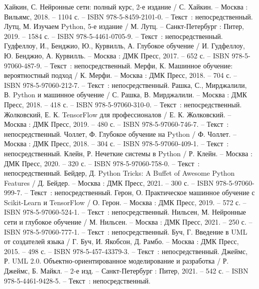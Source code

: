 
\begin{thebibliography}{50}

     Хайкин, С. Нейронные сети: полный курс, 2-е издание / С. Хайкин. – Москва : Вильямс, 2018. – 1104 с. – ISBN 978-5-8459-2101-0. – Текст~: непосредственный.
     Лутц, М. Изучаем Python, 5-е издание / М. Лутц. – Санкт-Петербург : Питер, 2019. – 1584 с. – ISBN 978-5-4461-0705-9. – Текст~: непосредственный.
     Гудфеллоу, И., Бенджио, Ю., Курвилль, А. Глубокое обучение / И. Гудфеллоу, Ю. Бенджио, А. Курвилль. – Москва : ДМК Пресс, 2017. – 652 с. – ISBN 978-5-97060-487-9. – Текст~: непосредственный.
     Мерфи, К. Машинное обучение: вероятностный подход / К. Мерфи. – Москва : ДМК Пресс, 2018. – 704 с. – ISBN 978-5-97060-212-7. – Текст~: непосредственный.
     Рашка, С., Мирджалили, В. Python и машинное обучение / С. Рашка, В. Мирджалили. – Москва : ДМК Пресс, 2018. – 418 с. – ISBN 978-5-97060-310-0. – Текст~: непосредственный.
     Жолковский, Е. К. TensorFlow для профессионалов / Е. К. Жолковский. – Москва : ДМК Пресс, 2019. – 480 с. – ISBN 978-5-97060-746-7. – Текст~: непосредственный.
     Чоллет, Ф. Глубокое обучение на Python / Ф. Чоллет. – Москва : ДМК Пресс, 2018. – 304 с. – ISBN 978-5-97060-409-1. – Текст~: непосредственный.
     Клейн, Р. Нечеткие системы в Python / Р. Клейн. – Москва : ДМК Пресс, 2020. – 320 с. – ISBN 978-5-97060-758-0. – Текст~: непосредственный.
     Бейдер, Д. Python Tricks: A Buffet of Awesome Python Features / Д. Бейдер. – Москва : ДМК Пресс, 2021. – 300 с. – ISBN 978-5-97060-999-7. – Текст~: непосредственный.
     Герон, О. Практическое машинное обучение с Scikit-Learn и TensorFlow / О. Герон. – Москва : ДМК Пресс, 2019. – 572 с. – ISBN 978-5-97060-524-1. – Текст~: непосредственный.
     Нильсен, М. Нейронные сети и глубокое обучение / М. Нильсен. – Москва : ДМК Пресс, 2021. – 250 с. – ISBN 978-5-97060-777-1. – Текст~: непосредственный.
     Буч, Г. Введение в UML от создателей языка / Г. Буч, И. Якобсон, Д. Рамбо. – Москва : ДМК Пресс, 2015. – 498 с. – ISBN 978-5-457-43379-3. – Текст~: непосредственный.
     Джеймс, Р. UML 2.0. Объектно-ориентированное моделирование и разработка / Р. Джеймс, Б. Майкл. – 2-е изд. – Санкт-Петербург : Питер, 2021. – 542 с. – ISBN 978-5-4461-9428-5. – Текст~: непосредственный.

\end{thebibliography}
